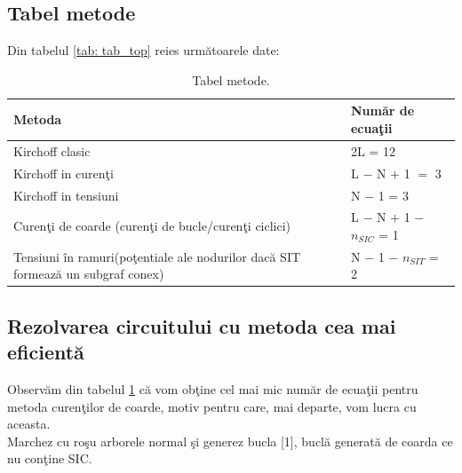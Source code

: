 \documentclass[multi=false, tikz, border=2mm]{article}
\newcommand\tab[1][0.6cm]{\hspace*{#1}}
\begin{document}
	\subsection{Tabel metode}
	\tab Din tabelul \ref{tab: tab_top} reies urm\u{a}toarele date:
	\vspace{-0.2cm}
	\begin{table}[h]
	\begin{center}	
	\caption{Tabel metode.}\label{tab_metode}
	\begin{tabular}{|p{10cm}|l|}		
			\hline
			Metoda & Num\u{a}r de ecua\c{t}ii\\
			\hline
			\hline
			Kirchoff clasic & 2L = 12\\
			\hline
			Kirchoff in curen\c{t}i & L $-$ N $+$ 1 $=$ 3\\
			\hline
			Kirchoff in tensiuni & N $-$ 1 = 3\\
			\hline
			Curen\c{t}i de coarde (curen\c{t}i de bucle/curen\c{t}i ciclici) & L $-$ N $+$ 1 $-$ $n_{SIC}$ = 1\\
			\hline
			Tensiuni \^{i}n ramuri(po\c{t}entiale ale nodurilor dac\u{a} SIT formeaz\u{a} un subgraf conex) & N $-$ 1 $-$ $n_{SIT}$ = 2\\
			\hline
	\end{tabular}
	\end{center}
	\end{table}
		
\vspace{-0.9cm}
	\subsection{Rezolvarea circuitului cu metoda cea mai eficient\u{a}}
	\tab Observ\u{a}m din tabelul \ref{tab_metode} c\u{a} vom ob\c{t}ine cel mai mic num\u{a}r de ecua\c{t}ii pentru metoda curen\c{t}ilor de coarde, motiv pentru care, mai departe, vom lucra cu aceasta.\\
	\tab Marchez cu ro\c{s}u arborele normal \c{s}i generez bucla [1], bucl\u{a} generat\u{a} de coarda ce nu con\c{t}ine SIC.
	
\end{document}
